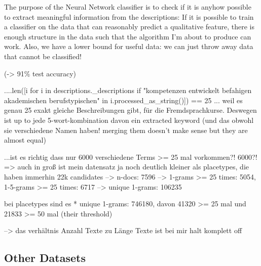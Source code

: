 \documentclass[11pt,
  paper=a4, 
  twoside,  %
  hidelinks,
  bibliography=totocnumbered,
	captions=tableheading,
	BCOR=10mm
]{scrreprt}
\theoremstyle{definition}
\begin{document}
The purpose of the Neural Network classifier is to check if it is anyhow possible to extract meaningful information from the descriptions: If it is possible to train a classifier on the data that can reasonably predict a qualitative feature, there is enough structure in the data such that the algorithm I'm about to produce can work.
Also, we have a lower bound for useful data: we can just throw away data that cannot be classified!

(-> 91\% test accuracy)


....len([i for i in descriptions._descriptions if "kompetenzen entwickelt befahigen akademischen berufstypischen" in i.processed_as_string()]) == 25  ... weil es genau 25 exakt gleiche Beschreibungen gibt, für die Fremdsprachkurse. Deswegen ist up to jede 5-wort-kombination davon ein extracted keyword
(und das obwohl sie verschiedene Namen haben! merging them doesn't make sense but they are almost equal)


...ist es richtig dass nur 6000 verschiedene Terms >= 25 mal vorkommen?! 6000?!
=> auch in groß ist mein datensatz ja noch deutlich kleiner als placetypes, die haben immerhin 22k candidates
--> n-docs: 7596
--> 1-grams >= 25 times: 5054, 1-5-grams >= 25 times: 6717
--> unique 1-grams: 106235

bei placetypes sind es 
* unique 1-grams: 746180, davon 41320 >= 25 mal und 21833 >= 50 mal (their threshold)

--> das verhältnis Anzahl Texte zu Länge Texte ist bei mir halt komplett off 



\subsection{Other Datasets}

\end{document}
